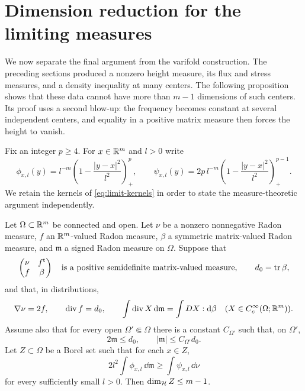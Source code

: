 \section{Dimension reduction for the limiting measures}
\label{sec:dimension-reduction}

We now separate the final argument from the varifold construction.
The preceding sections produced a nonzero height measure, its flux
and stress measures, and a density inequality at many centers. The
following proposition shows that these data cannot have more than
$m-1$ dimensions of such centers. Its proof uses a second blow-up:
the frequency becomes constant at several independent centers, and
equality in a positive matrix measure then forces the height to vanish.

Fix an integer $p\ge4$. For $x\in\mathbb R^m$ and $l>0$ write
\begin{equation}
 \label{eq:reduction-kernels}
 \phi_{x,l}(y)=l^{-m}\left(1-\frac{|y-x|^2}{l^2}\right)_+^p,
 \qquad
 \psi_{x,l}(y)=2p\,l^{-m}
       \left(1-\frac{|y-x|^2}{l^2}\right)_+^{p-1}.
\end{equation}
We retain the kernels of \eqref{eq:limit-kernels} in order to state
the measure-theoretic argument independently.

\begin{proposition}
\label{prop:measure-reduction}
Let $\Omega\subset\mathbb R^m$ be connected and open. Let $\nu$ be a
nonzero nonnegative Radon measure, $f$ an $\mathbb R^m$-valued Radon measure,
$\beta$ a symmetric matrix-valued Radon measure, and $\mathfrak m$
a signed Radon measure on $\Omega$. Suppose that
\begin{equation}
 \label{eq:abstract-psd}
 \begin{pmatrix}\nu&f^{\rm t}\\ f&\beta\end{pmatrix}
 \quad\hbox{is a positive semidefinite matrix-valued measure},
 \qquad d_0=\operatorname{tr}\beta,
\end{equation}
and that, in distributions,
\begin{equation}
 \label{eq:abstract-identities}
 \nabla\nu=2f,\qquad \operatorname{div} f=d_0,\qquad
 \int\operatorname{div} X\,\mathrm d\mathfrak m
       =\int DX:\mathrm d\beta
 \quad(X\in C_c^\infty(\Omega;\mathbb R^m)).
\end{equation}
Assume also that for every open $\Omega'\Subset\Omega$ there is a
constant $C_{\Omega'}$ such that, on $\Omega'$,
\begin{equation}
 \label{eq:abstract-sign}
 2\mathfrak m\le d_0,\qquad |\mathfrak m|\le C_{\Omega'}d_0.
\end{equation}
Let $Z\subset\Omega$ be a Borel set such that for each $x\in Z$,
\begin{equation}
 \label{eq:abstract-center}
 2l^2\int\phi_{x,l}\,\dd\mathfrak m
       \ge\int\psi_{x,l}\,\dd\nu
\end{equation}
for every sufficiently small $l>0$. Then
$\dim_{\mathcal H}Z\le m-1$.
\end{proposition}

